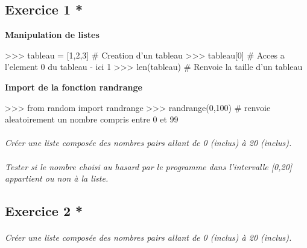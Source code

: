 \documentclass[11pt,oneside]{article}
\begin{document}
%
%



\setcounter{paragraph}{0}
\subsection*{Exercice 1 *}

\begin{py}
\textbf{Manipulation de listes}

\begin{python}
>>> tableau = [1,2,3] # Creation d'un tableau
>>> tableau[0] # Acces a l'element 0 du tableau - ici 1
>>> len(tableau) # Renvoie la taille d'un tableau
\end{python}

\textbf{Import de la fonction randrange}

\begin{python}
>>> from random import randrange
>>> randrange(0,100) # renvoie aleatoirement un nombre compris entre 0 et 99
\end{python}
\end{py}

\paragraph{}
\textit{Créer une liste composée des nombres pairs allant de 0 (inclus) à 20 (inclus).}

\paragraph{}
\textit{Tester si le nombre choisi au hasard par le programme dans l'intervalle [0,20] appartient ou non à la liste.}

\setcounter{paragraph}{0}
\subsection*{Exercice 2 *}

\paragraph{}
\textit{Créer une liste composée des nombres pairs allant de 0 (inclus) à 20 (inclus).}
\end{document}

